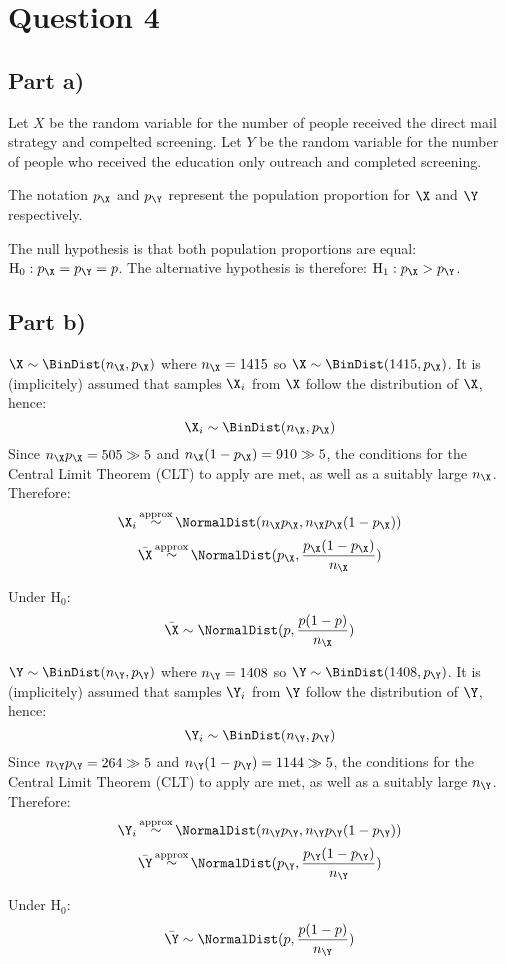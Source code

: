 \section{Question 4}

\subsection{Part a)}
Let $X$ be the random variable for the number of people received the direct mail strategy and compelted screening.
Let $Y$ be the random variable for the number of people who received the education only outreach and completed screening.

The notation $p_\X$ and $p_\Y$ represent the population proportion for $\X$ and $\Y$ respectively.

The null hypothesis is that both population proportions are equal: $\text{H}_0: p_\X = p_\Y = p$. The alternative hypothesis is therefore: $\text{H}_1 : p_\X > p_\Y$.

\subsection{Part b)}

$\X \sim \BinDist (n_\X, p_\X)$ where $n_\X = 1415$ so $\X \sim \BinDist (1415, p_\X)$.
It is (implicitely) assumed that samples $\X_i$ from $\X$ follow the distribution of $\X$, hence:
\[
\X_i \sim \BinDist(n_\X, p_\X)
\]
Since $n_\X p_\X = 505 \gg 5$ and $n_\X(1-p_\X)=910 \gg 5$, the conditions for the Central Limit Theorem (CLT) to apply are met, as well as a suitably large $n_\X$.
Therefore:
\[
\X_i \mathop \sim ^\text{approx} \NormalDist (n_\X p_\X, n_\X p_\X (1 - p_\X))
\]
\[
\bar{\X} \mathop \sim ^\text{approx} \NormalDist (p_\X, \frac{p_\X (1 - p_\X)}{n_\X})
\]

Under $\text{H}_0$:
\[
\bar{\X} \sim \NormalDist (p, \frac{p (1 - p)}{n_\X})
\]


$\Y \sim \BinDist (n_\Y, p_\Y)$ where $n_\Y = 1408$ so $\Y \sim \BinDist (1408, p_\Y)$.
It is (implicitely) assumed that samples $\Y_i$ from $\Y$ follow the distribution of $\Y$, hence:
\[
\Y_i \sim \BinDist(n_\Y, p_\Y)
\]
Since $n_\Y p_\Y = 264 \gg 5$ and $n_\Y(1-p_\Y)=1144 \gg 5$, the conditions for the Central Limit Theorem (CLT) to apply are met, as well as a suitably large $n_\Y$.
Therefore:
\[
\Y_i \mathop \sim ^\text{approx} \NormalDist (n_\Y p_\Y, n_\Y p_\Y (1 - p_\Y))
\]
\[
\bar{\Y} \mathop \sim ^\text{approx} \NormalDist (p_\Y, \frac{p_\Y (1 - p_\Y)}{n_\Y})
\]

Under $\text{H}_0$:
\[
\bar{\Y} \sim \NormalDist (p, \frac{p (1 - p)}{n_\Y})
\]

